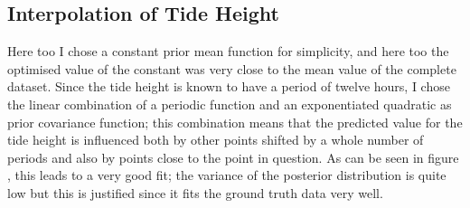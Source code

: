 \documentclass{article}
\begin{document}
            \subsection{Interpolation of Tide Height}

                Here too I chose a constant prior mean function for simplicity, and here too the optimised value of the constant was very close to the mean value of the complete dataset. Since the tide height is known to have a period of twelve hours, I chose the linear combination of a periodic function and an exponentiated quadratic as prior covariance function; this combination means that the predicted value for the tide height is influenced both by other points shifted by a whole number of periods and also by points close to the point in question. As can be seen in figure %
                , this leads to a very good fit; the variance of the posterior distribution is quite low but this is justified since it fits the ground truth data very well.

%
%
%
%
%
%
%
%
\end{document}
